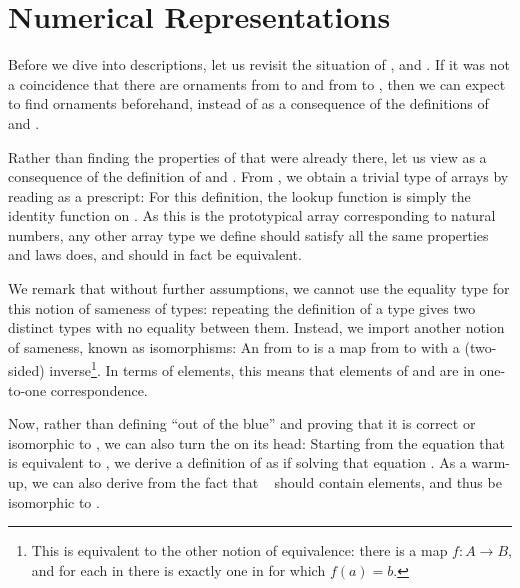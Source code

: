 \section{Numerical Representations}\label{sec:desc-numrep}
Before we dive into descriptions, let us revisit the situation of \bN{},  and . If it was not a coincidence that there are ornaments from \bN{} to  and from  to , then we can expect to find ornaments beforehand, instead of as a consequence of the definitions of  and .

Rather than finding the properties of  that were already there, let us view  as a consequence of the definition of \bN{} and . From \bN{}, we obtain a trivial type of arrays by reading  as a prescript:
For this definition, the lookup function is simply the identity function on . As this is the prototypical array corresponding to natural numbers, any other array type we define should satisfy all the same properties and laws  does, and should in fact be equivalent.


We remark that without further assumptions, we cannot use the equality type  for this notion of sameness of types: repeating the definition of a type gives two distinct types with no equality between them. Instead, we import another notion of sameness, known as isomorphisms:
An  from  to  is a map from  to  with a (two-sided) inverse\footnote{This is equivalent to the other notion of equivalence: there is a map $f : A \to B$, and for each  in  there is exactly one  in  for which $f(a) = b$.}. In terms of elements, this means that elements of  and  are in one-to-one correspondence.

Now, rather than defining  ``out of the blue'' and proving that it is correct or isomorphic to , we can also turn the  on its head: Starting from the equation that  is equivalent to , we derive a definition of  as if solving that equation \cite{calcdata}. As a warm-up, we can also derive  from the fact that \  should contain  elements, and thus be isomorphic to .

